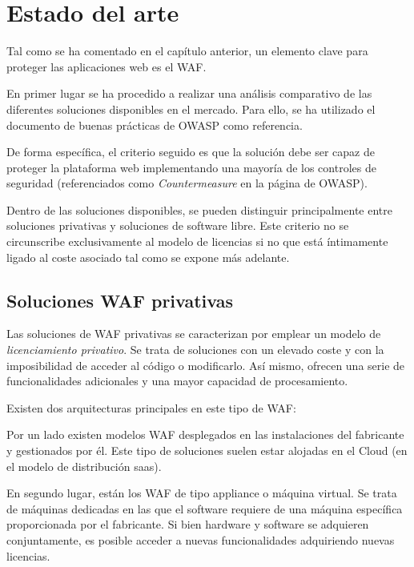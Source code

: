 \chapter{Estado del arte}
\label{subsec:estadoarte}
\par Tal como se ha comentado en el capítulo anterior, un elemento clave para proteger las aplicaciones web es el WAF.

\par En primer lugar se ha procedido a realizar una análisis comparativo de las diferentes soluciones disponibles en el mercado. Para ello, se ha utilizado el documento de buenas prácticas de OWASP\cite{owaspbestpractices} como referencia.
\par De forma específica, el criterio seguido es que la solución debe ser capaz de proteger la plataforma web implementando una mayoría de los controles de seguridad (referenciados como {\em Countermeasure} en la página de OWASP\cite[apartado
A3.2]{owaspbestpractices}).

\par Dentro de las soluciones disponibles, se pueden distinguir principalmente entre soluciones privativas y soluciones de software libre. Este
criterio no se circunscribe exclusivamente al modelo de licencias si no que está íntimamente ligado al coste asociado tal como se expone más adelante.

\section{Soluciones WAF privativas}
\par Las soluciones de WAF privativas se caracterizan por emplear un modelo de {\em licenciamiento privativo\cite{privativo}}. Se trata de
soluciones con un elevado coste y con la imposibilidad de acceder al código o modificarlo. Así mismo, ofrecen una serie de funcionalidades
adicionales y una mayor capacidad de procesamiento.
\par Existen dos arquitecturas principales en este tipo de WAF:
\par Por un lado existen modelos WAF desplegados en las instalaciones del fabricante y gestionados por él. Este tipo de soluciones suelen estar
alojadas en el Cloud (en el modelo de distribución \acrshort{saas}).
\par En segundo lugar, están los WAF de tipo appliance o máquina virtual. Se trata de máquinas dedicadas en las que el software requiere de una
máquina específica proporcionada por el fabricante. Si bien hardware y software se adquieren conjuntamente, es posible acceder a nuevas
funcionalidades adquiriendo nuevas licencias.

